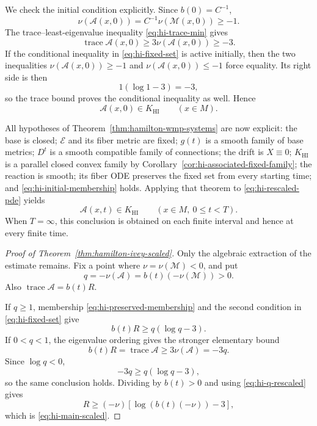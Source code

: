 \documentclass[10pt]{coll-l}
\newcommand{\trace}{\operatorname{trace}}
\theoremstyle{definition}
\theoremstyle{remark}
\numberwithin{section}{chapter}
\numberwithin{equation}{chapter}
\begin{document}
We check the initial condition explicitly.  Since $b(0)=C^{-1}$,
\[
 \nu(\mathcal A(x,0))=C^{-1}\nu(\mathcal M(x,0))\geq-1.
\]
The trace--least-eigenvalue inequality
\eqref{eq:hi-trace-min} gives
\[
 \trace\mathcal A(x,0)
   \geq3\nu(\mathcal A(x,0))\geq-3.
\]
If the conditional inequality in
\eqref{eq:hi-fixed-set} is active initially, then the two inequalities
$\nu(\mathcal A(x,0))\geq-1$ and
$\nu(\mathcal A(x,0))\leq-1$ force equality.  Its right side is then
\[
             1(\log1-3)=-3,
\]
so the trace bound proves the conditional inequality as well.  Hence
\begin{equation}
                  \mathcal A(x,0)\in K_{\mathrm{HI}}
                  \qquad(x\in M).                         \label{eq:hi-initial-membership}
\end{equation}

All hypotheses of Theorem~\ref{thm:hamilton-wmp-systems} are now explicit:
the base is closed; $\mathcal E$ and its fiber metric are fixed; $g(t)$ is
a smooth family of base metrics; $D^t$ is a smooth compatible family of
connections; the drift is $X\equiv0$; $K_{\mathrm{HI}}$ is a parallel closed convex family by
Corollary~\ref{cor:hi-associated-fixed-family}; the reaction is smooth; its
fiber ODE preserves the fixed set from every starting time; and
\eqref{eq:hi-initial-membership} holds.  Applying that theorem to
\eqref{eq:hi-rescaled-pde} yields
\begin{equation}
                  \mathcal A(x,t)\in K_{\mathrm{HI}}
                  \qquad(x\in M,\ 0\leq t<T).             \label{eq:hi-preserved-membership}
\end{equation}
When $T=\infty$, this conclusion is obtained on each finite interval and
hence at every finite time.

\begin{proof}[Proof of Theorem~\ref{thm:hamilton-ivey-scaled}]
Only the algebraic extraction of the estimate remains.  Fix a point where
$\nu=\nu(\mathcal M)<0$, and put
\begin{equation}
 q=-\nu(\mathcal A)=b(t)(-\nu(\mathcal M))>0.              \label{eq:hi-q-rescaled}
\end{equation}
Also $\trace\mathcal A=b(t)R$.

If $q\geq1$, membership
\eqref{eq:hi-preserved-membership} and the second condition in
\eqref{eq:hi-fixed-set} give
\[
 b(t)R\geq q(\log q-3).
\]
If $0<q<1$, the eigenvalue ordering gives the stronger elementary bound
\[
 b(t)R=\trace\mathcal A
     \geq3\nu(\mathcal A)=-3q.
\]
Since $\log q<0$,
\[
                  -3q\geq q(\log q-3),
\]
so the same conclusion holds.  Dividing by $b(t)>0$ and using
\eqref{eq:hi-q-rescaled} gives
\[
 R\geq(-\nu)
       \left[\log\!\left(b(t)(-\nu)\right)-3\right],
\]
which is \eqref{eq:hi-main-scaled}.
\end{proof}
\end{document}
